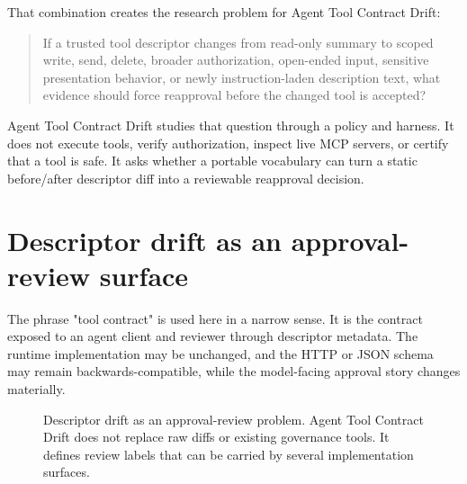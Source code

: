 \documentclass[11pt,letterpaper]{article}
\newcommand{\project}{Agent Tool Contract Drift}
\begin{document}
That combination creates the research problem for \project{}:
\begin{quote}
If a trusted tool descriptor changes from read-only summary to scoped write, send, delete, broader authorization, open-ended input, sensitive presentation behavior, or newly instruction-laden description text, what evidence should force reapproval before the changed tool is accepted?
\end{quote}

\project{} studies that question through a policy and harness. It does not execute tools, verify authorization, inspect live MCP servers, or certify that a tool is safe. It asks whether a portable vocabulary can turn a static before/after descriptor diff into a reviewable reapproval decision.

\section{Descriptor drift as an approval-review surface}

The phrase "tool contract" is used here in a narrow sense. It is the contract exposed to an agent client and reviewer through descriptor metadata. The runtime implementation may be unchanged, and the HTTP or JSON schema may remain backwards-compatible, while the model-facing approval story changes materially.

\begin{figure}[H]
\centering
{}
\caption{Descriptor drift as an approval-review problem. \project{} does not replace raw diffs or existing governance tools. It defines review labels that can be carried by several implementation surfaces.}
\end{figure}
\end{document}
